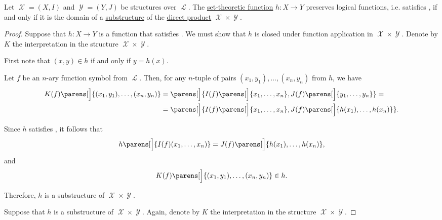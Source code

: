\begin{proposition}\label{thm:first_order_homomorphism_as_substructure}
  Let \( \mscrX = (X, I) \) and \( \mscrY = (Y, J) \) be structures over \( \mscrL \). The \hyperref[def:function]{set-theoretic function} \( h: X \to Y \) preserves logical functions, i.e. satisfies , if and only if it is the domain of a \hyperref[def:first_order_substructure]{substructure} of the \hyperref[def:first_order_direct_product]{direct product} \( \mscrX \times \mscrY \).
\end{proposition}
\begin{proof}
  \SufficiencySubProof Suppose that \( h: X \to Y \) is a function that satisfies . We must show that \( h \) is closed under function application in \( \mscrX \times \mscrY \). Denote by \( K \) the interpretation in the structure \( \mscrX \times \mscrY \).

  First note that \( (x, y) \in h \) if and only if \( y = h(x) \).

  Let \( f \) be an \( n \)-ary function symbol from \( \mscrL \). Then, for any \( n \)-tuple of pairs \( (x_1, y_1), \ldots, (x_n, y_n) \) from \( h \), we have
  \begin{align*}
    K(f)\parens[\Big]{ (x_1, y_1), \ldots, (x_n, y_n) }
    &=
    \parens[\Big]{ I(f)\parens[\Big]{ x_1, \ldots, x_n }, J(f)\parens[\Big]{ y_1, \ldots, y_n } }
    = \\ &=
    \parens[\Big]{ I(f)\parens[\Big]{ x_1, \ldots, x_n }, J(f)\parens[\Big]{ h(x_1), \ldots, h(x_n) } }.
  \end{align*}

  Since \( h \) satisfies , it follows that
  \begin{equation*}
    h\parens[\Big]{ I(f)(x_1, \ldots, x_n) } = J(f)\parens[\Big]{ h(x_1), \ldots, h(x_n) },
  \end{equation*}
  and
  \begin{equation*}
    K(f)\parens[\Big]{ (x_1, y_1), \ldots, (x_n, y_n) } \in h.
  \end{equation*}

  Therefore, \( h \) is a substructure of \( \mscrX \times \mscrY \).

  \NecessitySubProof Suppose that \( h \) is a substructure of \( \mscrX \times \mscrY \). Again, denote by \( K \) the interpretation in the structure \( \mscrX \times \mscrY \).


\end{proof}
